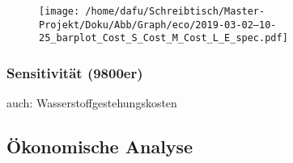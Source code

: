 \documentclass[onecolumn,10pt,titlepage]{article}
\begin{document}
%
%
%

\begin{figure}[H]
	
	\centering
	\texttt{[image: /home/dafu/Schreibtisch/Master-Projekt/Doku/Abb/Graph/eco/2019-03-02--10-25\_barplot\_Cost\_S\_Cost\_M\_Cost\_L\_E\_spec.pdf]}
	\caption{ }
	\label{fig:analy_COST_Espec} 
\end{figure}


\subsubsection{Sensitivität (9800er)}

auch: Wasserstoffgestehungskosten


\subsection{Ökonomische Analyse}
\end{document}
